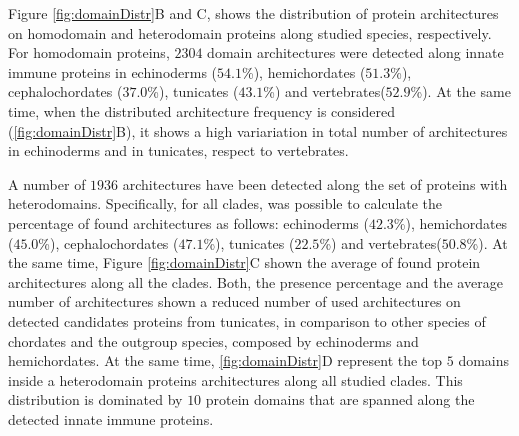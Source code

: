 \documentclass[11pt]{article}
\begin{document}
Figure \ref{fig:domainDistr}B and C, shows the distribution of protein 
architectures on homodomain and heterodomain proteins along studied species, 
respectively. For homodomain proteins, $2304$ domain architectures were 
detected along innate immune proteins in echinoderms ($54.1$\%), hemichordates 
($51.3$\%), cephalochordates ($37.0$\%), tunicates ($43.1$\%) and 
vertebrates($52.9$\%). At the same time, when the distributed architecture 
frequency  is considered (\ref{fig:domainDistr}B), it shows a high variariation 
in total number of architectures in echinoderms and in tunicates, respect to 
vertebrates.

A number of $1936$ architectures have been detected along the set of proteins 
with heterodomains. Specifically, for all clades, was possible to calculate the 
percentage of found architectures as follows: echinoderms ($42.3$\%), hemichordates ($45.0$\%),
cephalochordates ($47.1$\%), tunicates ($22.5$\%) and vertebrates($50.8$\%). 
At the same time, Figure \ref{fig:domainDistr}C shown the average of found 
protein architectures along all the clades. Both, the presence percentage 
and the average number of architectures shown a reduced number of used 
architectures on detected candidates proteins from tunicates, in comparison 
to other species of chordates and the outgroup species, composed by 
echinoderms and hemichordates. 
At the same time, \ref{fig:domainDistr}D represent the top $5$ domains 
inside a heterodomain proteins architectures along all studied clades. This 
distribution is dominated by $10$ protein domains that are spanned 
along the detected innate immune proteins. 
\end{document}
